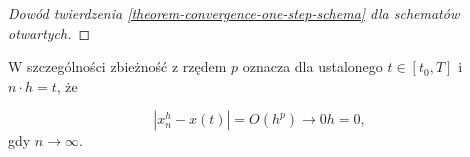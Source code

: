 \documentclass[12pt,a4paper]{report}
\begin{document}
\begin{example} 
\begin{proof}[Dowód twierdzenia \ref{theorem-convergence-one-step-schema} dla schematów otwartych]
\end{proof}

\begin{remark*}
W szczególności zbieżność z rzędem $p$ oznacza dla ustalonego $t \in [t_0,T]$ i $n \cdot h = t$, że

$$
|x_n^{h} - x(t)| = O(h^{p}) \to 0  h = 0,
$$
gdy $n \to \infty$. 
\end{remark*}









\end{example}
\end{document}
